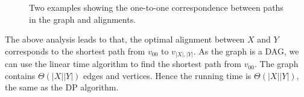 \begin{figure}[h!]
\centering{}
\caption{Two examples showing the one-to-one correspondence between paths in the graph and alignments.}
\label{fig:graph2}
\end{figure}

The above analysis leads to that, the optimal alignment between $X$ and $Y$
corresponds to the shortest path from  $v_{00}$ to $v_{|X|,|Y|}$.
As the graph is a DAG, we can use the linear time algorithm to find the shortest path from $v_{00}$.
The graph contains $\Theta(|X||Y|)$ edges and vertices.
Hence the running time is $\Theta(|X||Y|)$,
the same as the DP algorithm.

